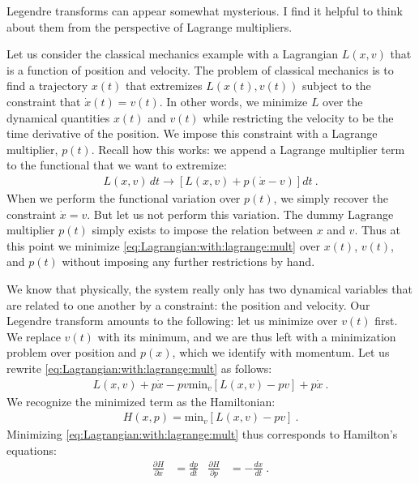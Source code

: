 \documentclass[
  11pt,
	colorful,
	raggedright,
]{tufte-style-thesis-flip}
\begin{document}
Legendre transforms can appear somewhat mysterious. I find it helpful to think about them from the perspective of Lagrange multipliers. 

Let us consider the classical mechanics example with a Lagrangian $L(x,v)$ that is a function of position and velocity. The problem of classical mechanics is to find a trajectory $x(t)$ that extremizes $L(x(t),v(t))$ subject to the constraint that $\dot x(t) = v(t)$. In other words, we minimize $L$ over the dynamical quantities $x(t)$ and $v(t)$  while restricting the velocity to be the time derivative of the position.  We impose this constraint with a Lagrange multiplier, $p(t)$. Recall how this works: we append a Lagrange multiplier term to the functional that we want to extremize:
\begin{align}
  L(x,v)\, dt \to \left[L(x,v) + p(\dot x - v)\right]dt \ .
  \label{eq:Lagrangian:with:lagrange:mult}
\end{align}
When we perform the functional variation over $p(t)$, we simply recover the constraint $\dot x = v$. But let us not perform this variation. The dummy Lagrange multiplier $p(t)$ simply exists to impose the relation between $x$ and $v$. Thus at this point we minimize \eqref{eq:Lagrangian:with:lagrange:mult} over $x(t)$, $v(t)$, and $p(t)$ without imposing any further restrictions by hand. 

We know that physically, the system really only has two dynamical variables that are related to one another by a constraint: the position and velocity. 
%
Our Legendre transform amounts to the following: let us minimize over $v(t)$ first. We replace $v(t)$ with its minimum, and we are thus left with a minimization problem over position and $p(x)$, which we identify with momentum. Let us rewrite \eqref{eq:Lagrangian:with:lagrange:mult} as follows:
\begin{align}
  L(x,v) + p\dot x - pv
 \text{min}_v \left[L(x,v) - pv\right] + p\dot x \ .
\end{align}
We recognize the minimized term as the Hamiltonian:
\begin{align}
  H(x,p) = \text{min}_v \left[L(x,v) - pv\right] \ .
\end{align}
Minimizing \eqref{eq:Lagrangian:with:lagrange:mult} thus corresponds to Hamilton's equations:
\begin{align}
  \frac{\partial H}{\partial x}
  &=
  \frac{d p}{dt}
  &
  \frac{\partial H}{\partial p}
  &=
  -\frac{d x}{dt} \ .
\end{align}
\end{document}
